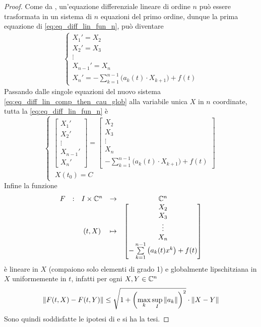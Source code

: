 \begin{proposition}
\begin{proof}
		Come da , un'equazione differenziale lineare di ordine $n$ può essere trasformata in un sistema di $n$ equazioni del primo ordine, dunque la prima equazione di \cref{eq:eq_diff_lin_fun_n}, può diventare
		\begin{align}
		\label{eq:eq_diff_lin_comp_then_cau_glob}
		\begin{cases}
			X_1' = X_2\\
			X_2' = X_3\\
			\vdots\\
			X_{n-1}' = X_{n}\\
			X_n' = -\sum\limits_{k=1}^{n-1}\bigl( a_k(t) \cdot X_{k+1} \bigr)+f(t)
		\end{cases}
		\end{align}
		Passando dalle singole equazioni del nuovo sistema \cref{eq:eq_diff_lin_comp_then_cau_glob} alla variabile unica $X$ in $n$ coordinate, tutta la \cref{eq:eq_diff_lin_fun_n} è
		\begin{equation*}
		\begin{cases}
			\left[\begin{matrix} X_1'\\X_2'\\\vdots\\X_{n-1}'\\X_n' \end{matrix}\right] = \left[\begin{matrix} X_2\\X_3\\\vdots\\X_{n}\\-\sum\limits_{k=1}^{n-1}\bigl( a_k(t) \cdot X_{k+1} \bigr)+f(t) \end{matrix}\right]\\
			\;X(t_0)=C
		\end{cases}
		\end{equation*}
		Infine la funzione
		\begin{equation*}
			\begin{array}{ccccc} {F} & : & {I \times \mathbb{C}^n} & \to & {\mathbb{C}^n} \\ & & {(t,X)} & \mapsto & {\left[\begin{matrix} X_2\\X_3\\\vdots\\X_{n}\\-\sum\limits_{k=1}^{n-1}\left(a_k(t)x^k\right)+f(t) \end{matrix}\right]} \\ \end{array}
		\end{equation*}
		è lineare in $X$ (compaiono solo elementi di grado 1) e globalmente lipschitziana in $X$ uniformemente in $t$, infatti per ogni $X,Y\in\mathbb{C}^n$
		$$\left\|F(t,X)-F(t,Y)\right\|\le \sqrt{1+\left( \max\limits_k \sup\limits_I \left\|a_k\right\| \right)^2}\cdot\left\|X-Y\right\|$$ %
		Sono quindi soddisfatte le ipotesi di  e si ha la tesi.
	\end{proof}
\end{proposition}

